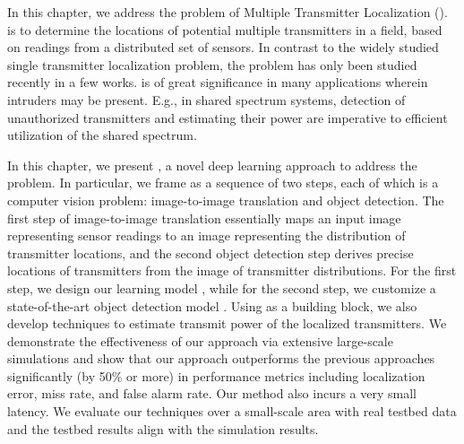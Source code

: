 In this chapter, we address the problem of Multiple Transmitter Localization (\mtl).
\mtl is to determine the
locations of potential multiple transmitters in a field, based on readings from a distributed set of sensors.
In contrast to the widely studied single transmitter localization problem, the \mtl problem has only been studied recently in a few works.
\mtl is of great significance in many applications wherein intruders
may be present. E.g., in shared spectrum systems, detection of unauthorized transmitters and estimating their power are imperative to 
efficient utilization of the shared spectrum.
	
In this chapter, we present \our, a novel deep learning approach to address the \mtl problem.  
In particular, we frame
\mtl as a sequence of two steps, each of which is a computer vision problem: image-to-image translation and object detection. 
The first step of image-to-image translation essentially maps an input image representing sensor readings to an 
image representing the distribution of transmitter locations, and the second object detection step derives precise
locations of transmitters from the image of transmitter distributions.
For the first step, we design our learning model \imgimg, while for the second step, we customize a 
state-of-the-art object detection model \yolocust. 
Using  \our as a building block, we also develop techniques to estimate transmit power of the localized transmitters.
We demonstrate the effectiveness of our approach
via extensive large-scale simulations and show that our approach outperforms the previous approaches 
significantly (by 50\% or more) in performance metrics including localization error, miss rate, and false alarm rate. 
Our method also incurs a very small latency.
We evaluate our techniques over a small-scale area with real testbed data and the testbed results align with the simulation results.
